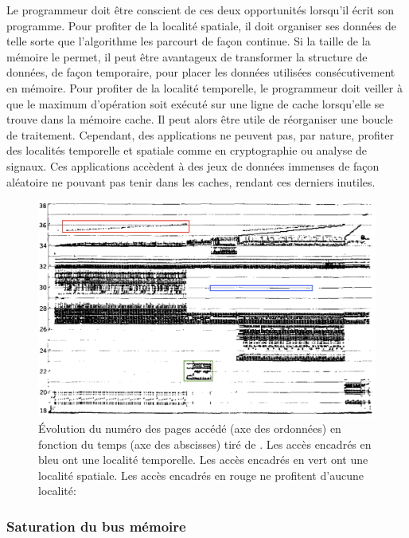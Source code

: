 Le programmeur doit être conscient de ces deux opportunités lorsqu'il écrit son programme. Pour profiter de la localité spatiale, il doit organiser ses données de telle sorte que l'algorithme les parcourt de façon continue. Si la taille de la mémoire le permet, il peut être avantageux de transformer la structure de données, de façon temporaire, pour placer les données utilisées consécutivement en mémoire. Pour profiter de la localité temporelle, le programmeur doit veiller à que le maximum d'opération soit exécuté sur une ligne de cache lorsqu'elle se trouve dans la mémoire cache. Il peut alors être utile de réorganiser une boucle de traitement. Cependant, des applications ne peuvent pas, par nature, profiter des localités temporelle et spatiale comme en cryptographie ou analyse de signaux. Ces applications accèdent à des jeux de données immenses de façon aléatoire ne pouvant pas tenir dans les caches, rendant ces derniers inutiles.


\begin{figure}
    \center
    \includegraphics[width=14cm]{images/cpu_locality.png}
    \caption{ Évolution du numéro des pages accédé (axe des ordonnées) en fonction du temps (axe des abscisses) tiré de \cite{Hatfield:1971}. Les accès encadrés en bleu ont une localité temporelle. Les accès encadrés en vert ont une localité spatiale. Les accès encadrés en rouge ne profitent d'aucune localité: 
    \label{pic_cpu_locality}}
\end{figure}




\subsubsection{Saturation du bus mémoire}

